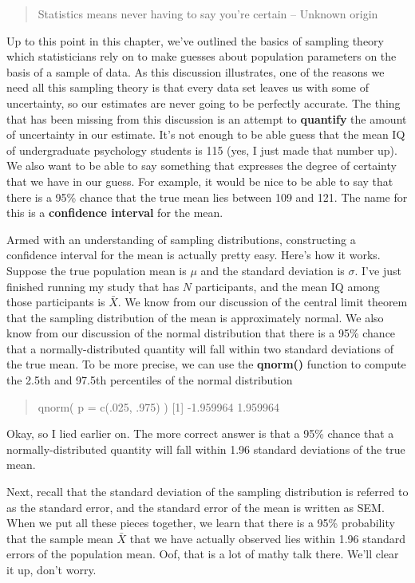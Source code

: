 \documentclass[
]{book}
\begin{document}
\begin{quote}
Statistics means never having to say you're certain -- Unknown origin
\end{quote}

Up to this point in this chapter, we've outlined the basics of sampling theory which statisticians rely on to make guesses about population parameters on the basis of a sample of data. As this discussion illustrates, one of the reasons we need all this sampling theory is that every data set leaves us with some of uncertainty, so our estimates are never going to be perfectly accurate. The thing that has been missing from this discussion is an attempt to \textbf{quantify} the amount of uncertainty in our estimate. It's not enough to be able guess that the mean IQ of undergraduate psychology students is 115 (yes, I just made that number up). We also want to be able to say something that expresses the degree of certainty that we have in our guess. For example, it would be nice to be able to say that there is a 95\% chance that the true mean lies between 109 and 121. The name for this is a \textbf{confidence interval} for the mean.

Armed with an understanding of sampling distributions, constructing a confidence interval for the mean is actually pretty easy. Here's how it works. Suppose the true population mean is \(\mu\) and the standard deviation is \(\sigma\). I've just finished running my study that has \(N\) participants, and the mean IQ among those participants is \(\bar{X}\). We know from our discussion of the central limit theorem that the sampling distribution of the mean is approximately normal. We also know from our discussion of the normal distribution that there is a 95\% chance that a normally-distributed quantity will fall within two standard deviations of the true mean. To be more precise, we can use the \textbf{qnorm()} function to compute the 2.5th and 97.5th percentiles of the normal distribution

\begin{quote}
qnorm( p = c(.025, .975) ) {[}1{]} -1.959964 1.959964
\end{quote}

Okay, so I lied earlier on. The more correct answer is that a 95\% chance that a normally-distributed quantity will fall within 1.96 standard deviations of the true mean.

Next, recall that the standard deviation of the sampling distribution is referred to as the standard error, and the standard error of the mean is written as SEM. When we put all these pieces together, we learn that there is a 95\% probability that the sample mean \(\bar{X}\) that we have actually observed lies within 1.96 standard errors of the population mean. Oof, that is a lot of mathy talk there. We'll clear it up, don't worry.
\end{document}
